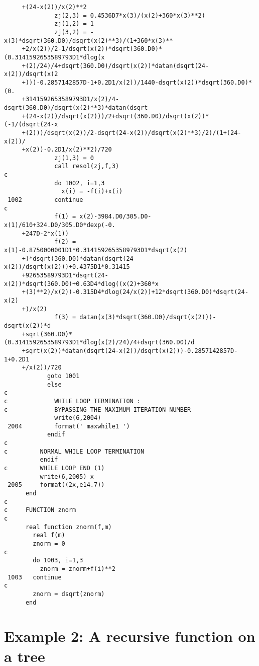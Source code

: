 \begin{verbatim}
     +(24-x(2))/x(2)**2
              zj(2,3) = 0.4536D7*x(3)/(x(2)+360*x(3)**2)
              zj(1,2) = 1
              zj(3,2) = -x(3)*dsqrt(360.D0)/dsqrt(x(2)**3)/(1+360*x(3)**
     +2/x(2))/2-1/dsqrt(x(2))*dsqrt(360.D0)*(0.3141592653589793D1*dlog(x
     +(2)/24)/4+dsqrt(360.D0)/dsqrt(x(2))*datan(dsqrt(24-x(2))/dsqrt(x(2
     +)))-0.2857142857D-1+0.2D1/x(2))/1440-dsqrt(x(2))*dsqrt(360.D0)*(0.
     +3141592653589793D1/x(2)/4-dsqrt(360.D0)/dsqrt(x(2)**3)*datan(dsqrt
     +(24-x(2))/dsqrt(x(2)))/2+dsqrt(360.D0)/dsqrt(x(2))*(-1/(dsqrt(24-x
     +(2)))/dsqrt(x(2))/2-dsqrt(24-x(2))/dsqrt(x(2)**3)/2)/(1+(24-x(2))/
     +x(2))-0.2D1/x(2)**2)/720
              zj(1,3) = 0
              call resol(zj,f,3)
c               
              do 1002, i=1,3
                x(i) = -f(i)+x(i)
 1002         continue
c             
              f(1) = x(2)-3984.D0/305.D0-x(1)/610+324.D0/305.D0*dexp(-0.
     +247D-2*x(1))
              f(2) = x(1)-0.8750000001D1*0.3141592653589793D1*dsqrt(x(2)
     +)*dsqrt(360.D0)*datan(dsqrt(24-x(2))/dsqrt(x(2)))+0.4375D1*0.31415
     +92653589793D1*dsqrt(24-x(2))*dsqrt(360.D0)+0.63D4*dlog((x(2)+360*x
     +(3)**2)/x(2))-0.315D4*dlog(24/x(2))+12*dsqrt(360.D0)*dsqrt(24-x(2)
     +)/x(2)
              f(3) = datan(x(3)*dsqrt(360.D0)/dsqrt(x(2)))-dsqrt(x(2))*d
     +sqrt(360.D0)*(0.3141592653589793D1*dlog(x(2)/24)/4+dsqrt(360.D0)/d
     +sqrt(x(2))*datan(dsqrt(24-x(2))/dsqrt(x(2)))-0.2857142857D-1+0.2D1
     +/x(2))/720
            goto 1001
            else
c              
c             WHILE LOOP TERMINATION :
c             BYPASSING THE MAXIMUM ITERATION NUMBER
              write(6,2004) 
 2004         format(' maxwhile1 ')
            endif
c          
c         NORMAL WHILE LOOP TERMINATION
          endif
c         WHILE LOOP END (1)
          write(6,2005) x
 2005     format((2x,e14.7))
      end
c      
c     FUNCTION znorm
c      
      real function znorm(f,m)
        real f(m)
        znorm = 0
c         
        do 1003, i=1,3
          znorm = znorm+f(i)**2
 1003   continue
c       
        znorm = dsqrt(znorm)
      end
\end{verbatim}

\newpage

\section{Example 2: A recursive function on a tree}
\label{e2}

